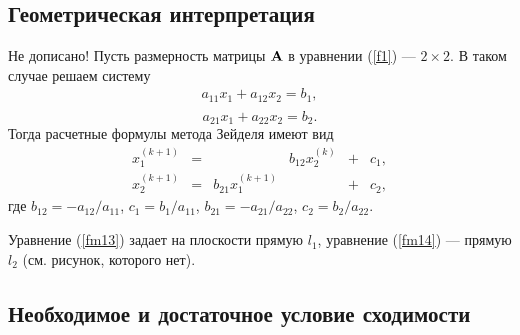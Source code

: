 \documentclass[12pt]{article}
\begin{document}
	\subsection*{Геометрическая интерпретация}
	
	Не дописано!
	Пусть размерность матрицы $\bold{A}$ в уравнении (\ref{f1}) --- $2\times2$.
	В таком случае решаем систему
	\begin{equation}
		\begin{gathered}
			a_{11}x_1+a_{12}x_2=b_1,\\
		\end{gathered}\label{fm13}
	\end{equation}
	\begin{equation}
		a_{21}x_1+a_{22}x_2=b_2.\label{fm14}
	\end{equation}
	Тогда расчетные формулы метода Зейделя имеют вид
	\begin{equation}
		\begin{matrix}
			x_1^{\left(k+1\right)} & = & & b_{12}x_2^{\left(k\right)} & + & c_1, \\
			x_2^{\left(k+1\right)} & = & b_{21}x_1^{\left(k+1\right)} & & + & c_2,
		\end{matrix}
	\end{equation}
	где $b_{12}=-a_{12}/a_{11}$, $c_1=b_1/a_{11}$, $b_{21}=-a_{21}/a_{22}$, $c_2=b_2/a_{22}$.
	
	Уравнение (\ref{fm13}) задает на плоскости прямую $l_1$, уравнение (\ref{fm14}) --- прямую $l_2$ (см. рисунок, которого нет).
	
	\subsection*{Необходимое и достаточное условие сходимости}
	
\end{document}
